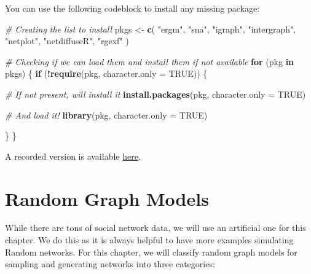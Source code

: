 \documentclass[
]{book}
\newenvironment{Shaded}{\begin{snugshade}}{\end{snugshade}}
\newcommand{\AttributeTok}[1]{\textcolor[rgb]{0.13,0.29,0.53}{#1}}
\newcommand{\CommentTok}[1]{\textcolor[rgb]{0.56,0.35,0.01}{\textit{#1}}}
\newcommand{\ConstantTok}[1]{\textcolor[rgb]{0.56,0.35,0.01}{#1}}
\newcommand{\ControlFlowTok}[1]{\textcolor[rgb]{0.13,0.29,0.53}{\textbf{#1}}}
\newcommand{\FunctionTok}[1]{\textcolor[rgb]{0.13,0.29,0.53}{\textbf{#1}}}
\newcommand{\NormalTok}[1]{#1}
\newcommand{\OtherTok}[1]{\textcolor[rgb]{0.56,0.35,0.01}{#1}}
\newcommand{\SpecialCharTok}[1]{\textcolor[rgb]{0.81,0.36,0.00}{\textbf{#1}}}
\newcommand{\StringTok}[1]{\textcolor[rgb]{0.31,0.60,0.02}{#1}}
\begin{document}
You can use the following codeblock to install any missing package:

\begin{Shaded}
\begin{Highlighting}[]
\CommentTok{\# Creating the list to install}
\NormalTok{pkgs }\OtherTok{\textless{}{-}} \FunctionTok{c}\NormalTok{(}
  \StringTok{"ergm"}\NormalTok{, }\StringTok{"sna"}\NormalTok{, }\StringTok{"igraph"}\NormalTok{, }\StringTok{"intergraph"}\NormalTok{, }\StringTok{"netplot"}\NormalTok{, }\StringTok{"netdiffuseR"}\NormalTok{, }\StringTok{"rgexf"}
\NormalTok{  )}

\CommentTok{\# Checking if we can load them and install them if not available}
\ControlFlowTok{for}\NormalTok{ (pkg }\ControlFlowTok{in}\NormalTok{ pkgs) \{}
  \ControlFlowTok{if}\NormalTok{ (}\SpecialCharTok{!}\FunctionTok{require}\NormalTok{(pkg, }\AttributeTok{character.only =} \ConstantTok{TRUE}\NormalTok{)) \{}

    \CommentTok{\# If not present, will install it}
    \FunctionTok{install.packages}\NormalTok{(pkg, }\AttributeTok{character.only =} \ConstantTok{TRUE}\NormalTok{)}

    \CommentTok{\# And load it!}
    \FunctionTok{library}\NormalTok{(pkg, }\AttributeTok{character.only =} \ConstantTok{TRUE}\NormalTok{)}

\NormalTok{  \}}
\NormalTok{\}}
\end{Highlighting}
\end{Shaded}

A recorded version is available \href{https://youtu.be/VasQf--gT-E}{here}.

\hypertarget{random-graph-models}{%
\section{Random Graph Models}\label{random-graph-models}}

While there are tons of social network data, we will use an artificial one for this chapter.
We do this as it is always helpful to have more examples simulating Random
networks. For this chapter, we will classify random graph models for sampling and
generating networks into three categories:
\end{document}
